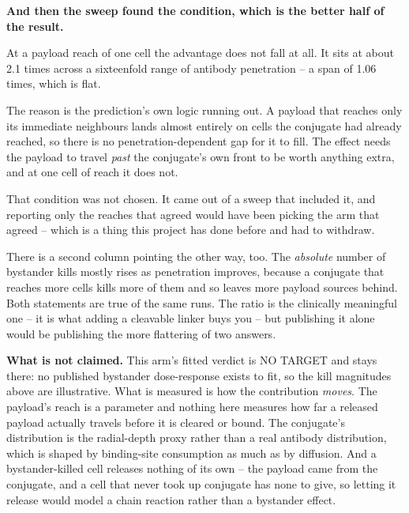 \documentclass[11pt,twoside,openright]{report}
\begin{document}
\textbf{And then the sweep found the condition, which is the better half of the result.}

\begin{refusal}
At a payload reach of one cell the advantage does not fall at all. It sits at about 2.1 times across a sixteenfold range of antibody penetration -- a span of 1.06 times, which is flat.

The reason is the prediction's own logic running out. A payload that reaches only its immediate neighbours lands almost entirely on cells the conjugate had already reached, so there is no penetration-dependent gap for it to fill. The effect needs the payload to travel \textit{past} the conjugate's own front to be worth anything extra, and at one cell of reach it does not.

That condition was not chosen. It came out of a sweep that included it, and reporting only the reaches that agreed would have been picking the arm that agreed -- which is a thing this project has done before and had to withdraw.

There is a second column pointing the other way, too. The \textit{absolute} number of bystander kills mostly rises as penetration improves, because a conjugate that reaches more cells kills more of them and so leaves more payload sources behind. Both statements are true of the same runs. The ratio is the clinically meaningful one -- it is what adding a cleavable linker buys you -- but publishing it alone would be publishing the more flattering of two answers.
\end{refusal}

\textbf{What is not claimed.} This arm's fitted verdict is NO TARGET and stays there: no published bystander dose-response exists to fit, so the kill magnitudes above are illustrative. What is measured is how the contribution \textit{moves}. The payload's reach is a parameter and nothing here measures how far a released payload actually travels before it is cleared or bound. The conjugate's distribution is the radial-depth proxy rather than a real antibody distribution, which is shaped by binding-site consumption as much as by diffusion. And a bystander-killed cell releases nothing of its own -- the payload came from the conjugate, and a cell that never took up conjugate has none to give, so letting it release would model a chain reaction rather than a bystander effect.
\end{document}
